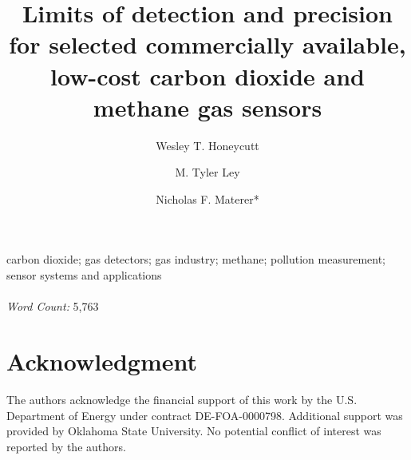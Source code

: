\documentclass[times]{joehreview}
\begin{document}
	
	\begin{frontmatter}
		\title{Limits of detection and precision for selected commercially available, low-cost carbon dioxide and methane gas sensors}
		
		\author{Wesley T. Honeycutt}
		\author{M. Tyler Ley}
		\author{Nicholas F. Materer*}	
		
		\begin{keyword}
			carbon dioxide; gas detectors; gas industry; methane; pollution measurement; sensor systems and applications
			\\~\\
			\textit{Word Count:} 5,763
		\end{keyword}
		
	\end{frontmatter}

	\section*{Acknowledgment}
	The authors acknowledge the financial support of this work by the U.S. Department of Energy under contract DE-FOA-0000798.  Additional support was provided by Oklahoma State University. No potential conflict of interest was reported by the authors.
\end{document}
